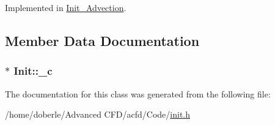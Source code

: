 Implemented in \hyperlink{class_init___advection_a336eaeee433ab0ec8a17eb61b9a17c41}{Init\+\_\+\+Advection}.



\subsection{Member Data Documentation}
\subsubsection[{\texorpdfstring{\+\_\+c}{_c}}]{$\ast$ Init\+::\+\_\+c\hspace{0.3cm}{\ttfamily [protected]}}\hypertarget{class_init_a0e16042aa3fadf50ccf598d0d255cd36}{}\label{class_init_a0e16042aa3fadf50ccf598d0d255cd36}


The documentation for this class was generated from the following file\+:\begin{DoxyCompactItemize}
\item 
/home/doberle/\+Advanced C\+F\+D/acfd/\+Code/\hyperlink{init_8h}{init.\+h}\end{DoxyCompactItemize}
